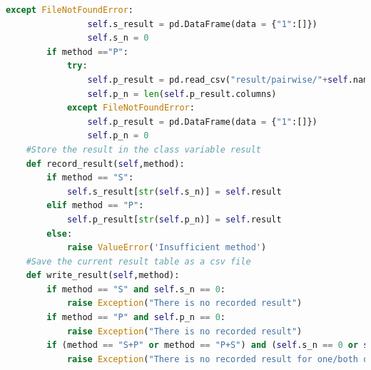 \documentclass[12pt]{article}
\begin{document}
\begin{lstlisting}[breaklines=true,language=Python]
            except FileNotFoundError:
                self.s_result = pd.DataFrame(data = {"1":[]})
                self.s_n = 0
        if method =="P":
            try:
                self.p_result = pd.read_csv("result/pairwise/"+self.name+".csv")
                self.p_n = len(self.p_result.columns)
            except FileNotFoundError:
                self.p_result = pd.DataFrame(data = {"1":[]})
                self.p_n = 0
    #Store the result in the class variable result
    def record_result(self,method):
        if method == "S":
            self.s_result[str(self.s_n)] = self.result
        elif method == "P":
            self.p_result[str(self.p_n)] = self.result
        else:
            raise ValueError('Insufficient method')
    #Save the current result table as a csv file
    def write_result(self,method):
        if method == "S" and self.s_n == 0:
            raise Exception("There is no recorded result")
        if method == "P" and self.p_n == 0:
            raise Exception("There is no recorded result")
        if (method == "S+P" or method == "P+S") and (self.s_n == 0 or self.p_n==0):
            raise Exception("There is no recorded result for one/both of the methods.")
        

\end{lstlisting}
\end{document}
